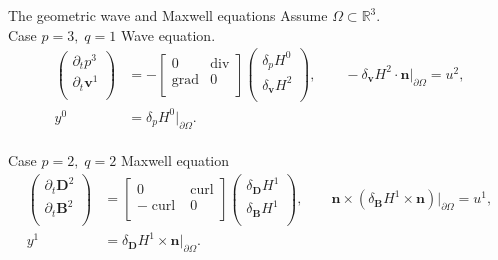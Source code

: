 \documentclass[aspectratio=169]{beamer}
\DeclareMathOperator*{\grad}{grad}
\renewcommand{\div}{\operatorname{div}}
\DeclareMathOperator*{\curl}{curl}
\newcommand{\bbR}{\mathbb{R}}
\begin{document}
\begin{frame}{The geometric wave and Maxwell equations}
	Assume $\Omega \subset \bbR^3$. \\
	Case $p=3, \; q=1$ Wave equation.
	\begin{equation*}
			\begin{aligned}
				\begin{pmatrix}
					\partial_t p^3 \\
					\partial_t \bm{v}^1\\
				\end{pmatrix} &= 
				-\begin{bmatrix}
					0 & \div \\
					\grad & 0 \\
				\end{bmatrix}
				\begin{pmatrix}
					\delta_{p} H^{0}\\
					\delta_{\bm{v}} H^{2}\\
				\end{pmatrix}, \qquad -\delta_{\bm{v}} H^{2} \cdot \bm{n}|_{\partial\Omega}  = u^{2}, \\
				y^{0} &= \delta_{p} H^{0}|_{\partial\Omega}.
			\end{aligned}	
	\end{equation*}
	\vspace{.5cm}\\
	Case $p=2, \;q=2$ Maxwell equation
	\begin{equation*}
		\begin{aligned}
			\begin{pmatrix}
				\partial_t \bm{D}^2 \\
				\partial_t \bm{B}^2\\
			\end{pmatrix} &= 
			\begin{bmatrix}
				0 & \curl \\
				-\curl & 0 \\
			\end{bmatrix}
			\begin{pmatrix}
				\delta_{\bm{D}} H^{1}\\
				\delta_{\bm{B}} H^{1}\\
			\end{pmatrix}, \qquad \bm{n} \times (\delta_{\bm{B}} H^{1} \times \bm{n})|_{\partial\Omega} = u^{1}, \\
			y^{1} &= \delta_{\bm{D}} H^{1} \times \bm{n}|_{\partial\Omega}. 
		\end{aligned}	
	\end{equation*}
	
\end{frame}
\end{document}
